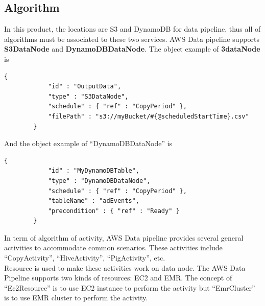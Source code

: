 	\subsection{Algorithm}
	In this product, the locations are S3 and DynamoDB for data pipeline, thus all of algorithms must be associated to these two services. AWS Data pipeline supports \textbf{S3DataNode} and \textbf{DynamoDBDataNode}. The  object example of \textbf{3dataNode} is
	\begin{lstlisting}[caption=S3 Data Node example\cite{z6}]
        {
            "id" : "OutputData",
            "type" : "S3DataNode",
            "schedule" : { "ref" : "CopyPeriod" },
            "filePath" : "s3://myBucket/#{@scheduledStartTime}.csv"
        }
	\end{lstlisting}
	And the object example of “DynamoDBDataNode” is 
	\begin{lstlisting}[caption=DynamoDB Data Node example\cite{z7}]
        {
            "id" : "MyDynamoDBTable",
            "type" : "DynamoDBDataNode",
            "schedule" : { "ref" : "CopyPeriod" },
            "tableName" : "adEvents",
            "precondition" : { "ref" : "Ready" }
        }
	\end{lstlisting}
	In term of algorithm of activity, AWS Data pipeline provides several general activities to accommodate common scenarios. These activities include “CopyActivity”, “HiveActivity”, “PigActivity”, etc.\\ 
    
    \noindent Resource is used to make these activities work on data node. The AWS Data Pipeline supports two kinds of resources: EC2 and EMR. The concept of “Ec2Resource” is to use EC2 instance to perform the activity but “EmrCluster” is to use EMR cluster to perform the activity. 

